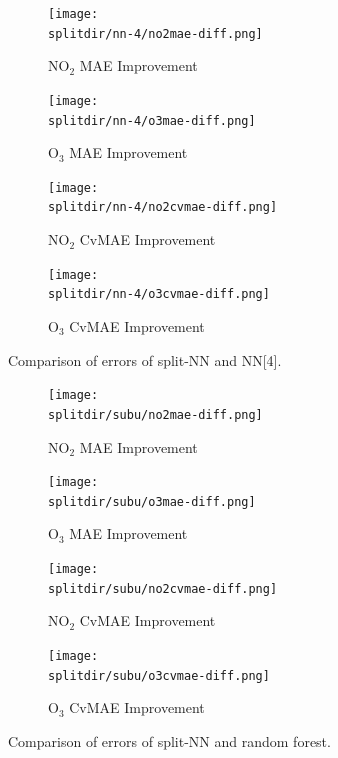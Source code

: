 \documentclass[journal abbreviation, manuscript]{copernicus}
\newcommand{\textus}[1]{$_{\text{#1}}$}
\begin{document}
\begin{figure}[H]
\begin{subfigure}{0.49\textwidth}
\texttt{[image: \\splitdir/nn-4/no2mae-diff.png]}
\caption{NO\textus{2} MAE Improvement}
\end{subfigure}
\begin{subfigure}{0.49\textwidth}
\texttt{[image: \\splitdir/nn-4/o3mae-diff.png]}
\caption{O\textus{3} MAE Improvement}
\end{subfigure}
\begin{subfigure}{0.49\textwidth}
\texttt{[image: \\splitdir/nn-4/no2cvmae-diff.png]}
\caption{NO\textus{2} CvMAE Improvement}
\end{subfigure}
\begin{subfigure}{0.49\textwidth}
\texttt{[image: \\splitdir/nn-4/o3cvmae-diff.png]}
\caption{O\textus{3} CvMAE Improvement}
\end{subfigure}
\caption{Comparison of errors of split-NN and NN[4].}
\end{figure}

\begin{figure}[H]
\begin{subfigure}{0.49\textwidth}
\texttt{[image: \\splitdir/subu/no2mae-diff.png]}
\caption{NO\textus{2} MAE Improvement}
\end{subfigure}
\begin{subfigure}{0.49\textwidth}
\texttt{[image: \\splitdir/subu/o3mae-diff.png]}
\caption{O\textus{3} MAE Improvement}
\end{subfigure}
\begin{subfigure}{0.49\textwidth}
\texttt{[image: \\splitdir/subu/no2cvmae-diff.png]}
\caption{NO\textus{2} CvMAE Improvement}
\end{subfigure}
\begin{subfigure}{0.49\textwidth}
\texttt{[image: \\splitdir/subu/o3cvmae-diff.png]}
\caption{O\textus{3} CvMAE Improvement}
\end{subfigure}
\caption{Comparison of errors of split-NN and random forest.}
\end{figure}

\fi

\renewcommand{\thetable}{\Alph{section}.\arabic{table}}
\end{document}
